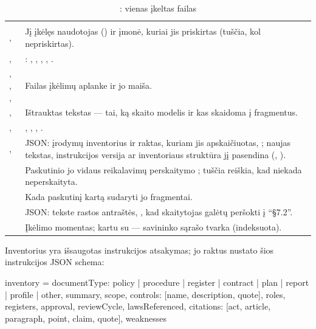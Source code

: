 \begin{xltabular}{\textwidth}{@{}L{38mm}Y@{}}
\caption{: vienas įkeltas failas}\label{tab:data:cd}\\
\toprule
{} &  \\
\midrule
\endfirsthead
\toprule
{} &  \\
\midrule
\endhead
\bottomrule
\endlastfoot
{},  & Jį įkėlęs naudotojas () ir įmonė, kuriai jis priskirtas (tuščia, kol nepriskirtas). \\
,  & : , , , , . \\
, , ,  & Failas įkėlimų aplanke ir jo maiša. \\
,  & Ištrauktas tekstas --- tai, ką skaito modelis ir kas skaidoma į fragmentus. \\
,  & , , , . \\
,  & JSON: įrodymų inventorius ir raktas, kuriam jis apskaičiuotas, ; naujas tekstas, instrukcijos versija ar inventoriaus struktūra jį pasendina (, ). \\
 & Paskutinio jo vidaus reikalavimų perskaitymo ; tuščia reiškia, kad niekada neperskaityta. \\
 & Kada paskutinį kartą sudaryti jo fragmentai. \\
 & JSON: tekste rastos antraštės, , kad skaitytojas galėtų peršokti į \enquote{§7.2}. \\
 & Įkėlimo momentas; kartu su  --- savininko sąrašo tvarka (indeksuota). \\
\end{xltabular}

Inventorius yra išsaugotas instrukcijos  atsakymas; jo raktus nustato
šios instrukcijos JSON schema:

\begin{codeblock}
inventory = {documentType: policy | procedure | register | contract | plan
                           | report | profile | other,
             summary, scope, controls: [{name, description, quote}],
             roles, registers, approval, reviewCycle, lawsReferenced,
             citations: [{act, article, paragraph, point, claim, quote}],
             weaknesses}
\end{codeblock}

